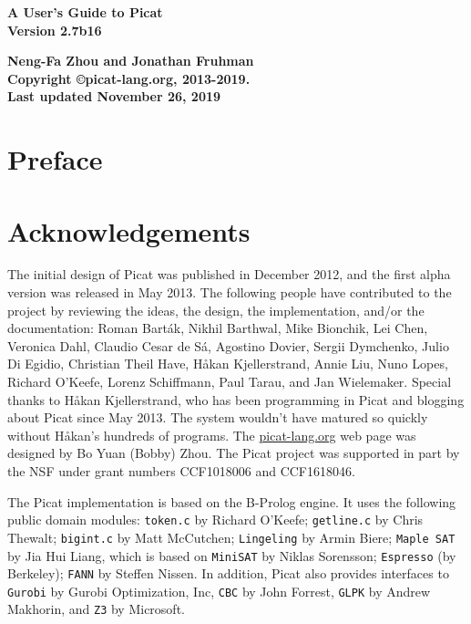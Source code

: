 \documentclass[11pt]{report}
\newcommand{\ignore}[1]{}
\begin{document}
\vspace*{4cm}
\begin{center}
{\Huge\bf A User's Guide to Picat} \\
{\large\bf Version 2.7b16} \\



\vspace*{8cm}

{\large\bf Neng-Fa Zhou and Jonathan Fruhman} \\
\vspace*{1cm}
{\bf Copyright \copyright picat-lang.org, 2013-2019.} \\
{\bf Last updated November 26, 2019} \\
\end{center}
\thispagestyle{empty}
\clearpage

\pagestyle{plain}

\section*{Preface}


\section*{Acknowledgements}
The initial design of Picat was published in December 2012, and the first alpha version was released in May 2013.  The following people have contributed to the project by reviewing the ideas, the design, the implementation, and/or the documentation: Roman Bart\'{a}k, Nikhil Barthwal, Mike Bionchik, Lei Chen, Veronica Dahl, Claudio Cesar de S\'{a}, Agostino Dovier, Sergii Dymchenko, Julio Di Egidio, Christian Theil Have, H{\aa}kan Kjellerstrand,  Annie Liu, Nuno Lopes, Richard O'Keefe, Lorenz Schiffmann, Paul Tarau, and Jan Wielemaker.  Special thanks to H{\aa}kan Kjellerstrand, who has been programming in Picat and blogging about Picat since May 2013. The system wouldn't have matured so quickly without H{\aa}kan's hundreds of programs. The \url{picat-lang.org} web page was designed by Bo Yuan (Bobby) Zhou. The Picat project was supported in part by the NSF under grant numbers CCF1018006 and CCF1618046.

The Picat implementation is based on the B-Prolog engine. It uses the following public domain modules: \ignore{\texttt{prism} by Taisuke Sato and Yoshitaka Kameya; }\texttt{token.c} by Richard O'Keefe; \texttt{getline.c} by Chris Thewalt; \texttt{bigint.c} by Matt McCutchen; \texttt{Lingeling} by Armin Biere; \texttt{Maple SAT} by Jia Hui Liang, which is based on \texttt{MiniSAT} by Niklas Sorensson; \texttt{Espresso} (by Berkeley); \texttt{FANN} by Steffen Nissen. In addition, Picat also provides interfaces to \texttt{Gurobi} by Gurobi Optimization, Inc, \texttt{CBC} by John Forrest, \texttt{GLPK} by Andrew Makhorin, and \texttt{Z3} by Microsoft.
\end{document}
